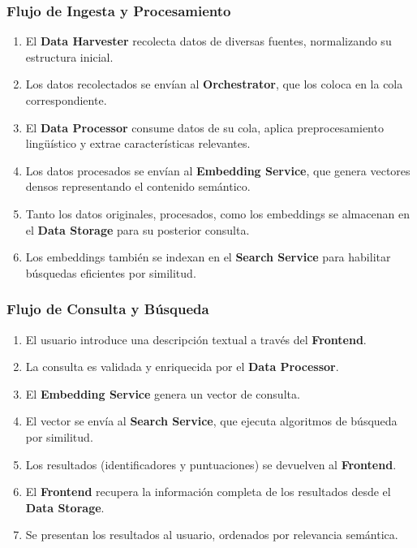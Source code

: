 \documentclass[12pt,a4paper]{article}
\begin{document}
\subsubsection{Flujo de Ingesta y Procesamiento}
\begin{enumerate}
    \item El \textbf{Data Harvester} recolecta datos de diversas fuentes, normalizando su estructura inicial.
    \item Los datos recolectados se envían al \textbf{Orchestrator}, que los coloca en la cola correspondiente.
    \item El \textbf{Data Processor} consume datos de su cola, aplica preprocesamiento lingüístico y extrae características relevantes.
    \item Los datos procesados se envían al \textbf{Embedding Service}, que genera vectores densos representando el contenido semántico.
    \item Tanto los datos originales, procesados, como los embeddings se almacenan en el \textbf{Data Storage} para su posterior consulta.
    \item Los embeddings también se indexan en el \textbf{Search Service} para habilitar búsquedas eficientes por similitud.
\end{enumerate}

\subsubsection{Flujo de Consulta y Búsqueda}
\begin{enumerate}
    \item El usuario introduce una descripción textual a través del \textbf{Frontend}.
    \item La consulta es validada y enriquecida por el \textbf{Data Processor}.
    \item El \textbf{Embedding Service} genera un vector de consulta.
    \item El vector se envía al \textbf{Search Service}, que ejecuta algoritmos de búsqueda por similitud.
    \item Los resultados (identificadores y puntuaciones) se devuelven al \textbf{Frontend}.
    \item El \textbf{Frontend} recupera la información completa de los resultados desde el \textbf{Data Storage}.
    \item Se presentan los resultados al usuario, ordenados por relevancia semántica.
\end{enumerate}
\end{document}
